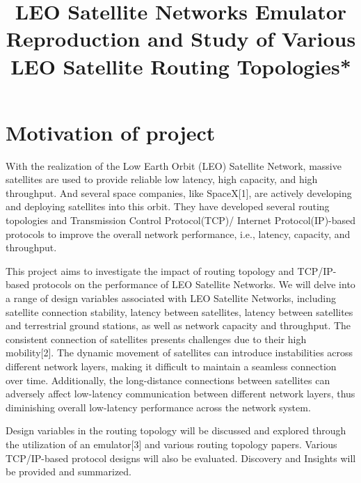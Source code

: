 \documentclass[conference]{IEEEtran}
\begin{document}
\title{LEO Satellite Networks Emulator Reproduction and Study of Various LEO Satellite Routing Topologies*\\


}

\author{

}

\maketitle

\section{Motivation of project}
With the realization of the Low Earth Orbit (LEO) Satellite Network, massive satellites are used to provide reliable low latency, high capacity, and high throughput. And several space companies, like SpaceX[1], are actively developing and deploying satellites into this orbit. They have developed several routing topologies and Transmission Control Protocol(TCP)/ Internet Protocol(IP)-based protocols to improve the overall network performance, i.e., latency, capacity, and throughput.	

This project aims to investigate the impact of routing topology and TCP/IP-based protocols on the performance of LEO Satellite Networks. We will delve into a range of design variables associated with LEO Satellite Networks, including satellite connection stability, latency between satellites, latency between satellites and terrestrial ground stations, as well as network capacity and throughput. The consistent connection of satellites presents challenges due to their high mobility[2]. The dynamic movement of satellites can introduce instabilities across different network layers, making it difficult to maintain a seamless connection over time. Additionally, the long-distance connections between satellites can adversely affect low-latency communication between different network layers, thus diminishing overall low-latency performance across the network system.

Design variables in the routing topology will be discussed and explored through the utilization of an emulator[3] and various routing topology papers. Various TCP/IP-based protocol designs will also be evaluated. Discovery and Insights will be provided and summarized.
\end{document}
